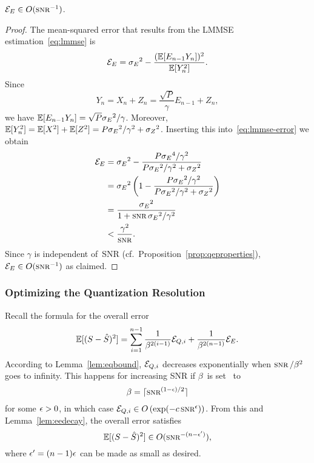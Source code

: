 \begin{lemma}
  \label{lem:eedecay}
  $\Ee \in O(\snr^{-1})$. 
\end{lemma}
\begin{proof}
  The mean-squared error that results from the LMMSE estimation~\eqref{eq:lmmse}
  is
  \begin{equation}
    \label{eq:lmmse-error}
    {{\mathcal{E}}_E} = {{\sigma_E}^2} - \frac{(\mathbb{E}[E_{n-1}
    Y_n])^2}{\mathbb{E}[Y_n^2]}. 
  \end{equation}
  Since
  \begin{equation*}
    Y_n = X_n + Z_n = \frac{\sqrt{P}}{\gamma} E_{n-1} + Z_n,
  \end{equation*}
  we have $\mathbb{E}[E_{n-1}Y_n] = \sqrt{P}{{\sigma_E}^2}/\gamma$. Moreover, $\mathbb{E}[Y_n^2] = \mathbb{E}[X^2]
  + \mathbb{E}[Z^2] = P{{\sigma_E}^2} / \gamma^2 +{{\sigma_Z}^2}$.  Inserting this
  into~\eqref{eq:lmmse-error} we obtain
  \begin{align*}
    \Ee &= \seq - \frac{P \se^4/\gamma^2}{P\seq/\gamma^2 + \szq} \\
    &= \seq \left( 1 - \frac{P\seq/\gamma^2}{P\seq/\gamma^2 + \szq} \right) \\
    &= \frac{\seq}{1 + \snr\seq/\gamma^2} \\
    & < \frac{\gamma^2}{\snr}.
  \end{align*}
  Since $\gamma$ is independent of~SNR (cf.\
  Proposition~\ref{prop:qeproperties}), $\Ee \in O(\snr^{-1})$ as claimed.
\end{proof}


\subsubsection{Optimizing the Quantization Resolution}

Recall the formula for the overall error
\begin{equation*}
  \mathbb{E}[(S-{\hat{S}})^2] = \sum_{i=1}^{n-1} \frac{1}{\beta^{2(i-1)}} {{\mathcal{E}}_{Q,i}} +
  \frac{1}{\beta^{2(n-1)}} {{\mathcal{E}}_E}.
\end{equation*}
According to Lemma~\ref{lem:eqbound}, ${{\mathcal{E}}_{Q,i}}$ decreases exponentially
when $\snr/\beta^2$ goes to infinity. This happens for increasing SNR if
$\beta$~is set \eg\ to
\begin{equation*}
  \beta = \lceil \snr^{(1-\e)/2} \rceil
\end{equation*}
for some $\epsilon > 0$, in which case $\Eqi \in O\left(\exp(-c \snr^\e) \right)$.
From this and Lemma~\ref{lem:eedecay}, the overall error satisfies
\begin{equation}
  \label{eq:overallO}
  \E[(S-\Sh)^2] \in O(\snr^{-(n - \e')}),
\end{equation}
where $\epsilon' = (n-1)\epsilon$ can be made as small as desired.

